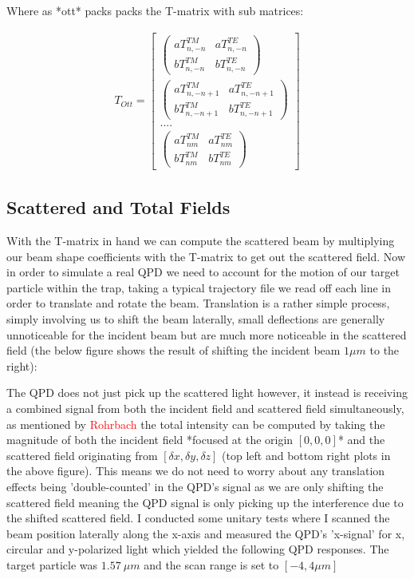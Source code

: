 Where as *ott* packs packs the T-matrix with sub matrices:

\begin{align}
	T_{Ott} = 
	\begin{bmatrix} 
		\begin{pmatrix}
			aT^{TM}_{n,-n} & aT^{TE}_{n,-n}\\ 
			bT^{TM}_{n,-n}&bT^{TE}_{n,-n}
		\end{pmatrix} \\ 
		\begin{pmatrix}
			aT^{TM}_{n,-n+1} & aT^{TE}_{n,-n+1}\\ 
			bT^{TM}_{n,-n+1} & bT^{TE}_{n,-n+1}
		\end{pmatrix}\\
		....\\ 
		\begin{pmatrix}
			aT^{TM}_{nm} & aT^{TE}_{nm}\\ 
			bT^{TM}_{nm} & bT^{TE}_{nm}
		\end{pmatrix}
	\end{bmatrix}
\end{align}

\subsection{Scattered and Total Fields}
With the T-matrix in hand we can compute the scattered beam by multiplying our beam shape coefficients with the T-matrix to get out the scattered field. Now in order to simulate a real QPD we need to account for the motion of our target particle within the trap, taking a typical trajectory file we read off each line in order to translate and rotate the beam. Translation is a rather simple process, simply involving us to shift the beam laterally, small deflections are generally unnoticeable for the incident beam but are much more noticeable in the scattered field (the below figure shows the result of shifting the incident beam $1\mu m$ to the right):

The QPD does not just pick up the scattered light however, it instead is receiving a combined signal from both the incident field and scattered field simultaneously, as mentioned by \textcolor{red}{Rohrbach} the total intensity can be computed by taking the magnitude of both the incident field *focused at the origin $[0,0,0]$* and the scattered field originating from $[\delta x, \delta y, \delta z]$ (top left and bottom right plots in the above figure). This means we do not need to worry about any translation effects being 'double-counted' in the QPD's signal as we are only shifting the scattered field meaning the QPD signal is only picking up the interference due to the shifted scattered field. I conducted some unitary tests where I scanned the beam position laterally along the x-axis and measured the QPD's 'x-signal' for x, circular and y-polarized light which yielded the following QPD responses. The target particle was $1.57\ \mu m$ and the scan range is set to $[-4, 4 \mu m]$

